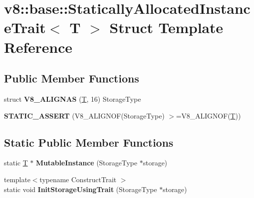 \hypertarget{structv8_1_1base_1_1StaticallyAllocatedInstanceTrait}{}\section{v8\+:\+:base\+:\+:Statically\+Allocated\+Instance\+Trait$<$ T $>$ Struct Template Reference}
\label{structv8_1_1base_1_1StaticallyAllocatedInstanceTrait}
\subsection*{Public Member Functions}
\begin{DoxyCompactItemize}
\item 
\mbox{\label{structv8_1_1base_1_1StaticallyAllocatedInstanceTrait_ae4f9b79f40375ee33813be5d10f3ad33}} 
struct {\bfseries V8\+\_\+\+A\+L\+I\+G\+N\+AS} (\mbox{\hyperlink{classv8_1_1internal_1_1torque_1_1T}{T}}, 16) Storage\+Type
\item 
\mbox{\label{structv8_1_1base_1_1StaticallyAllocatedInstanceTrait_ad25dddd250e48cf9f14f47214253c2de}} 
{\bfseries S\+T\+A\+T\+I\+C\+\_\+\+A\+S\+S\+E\+RT} (V8\+\_\+\+A\+L\+I\+G\+N\+OF(Storage\+Type) $>$=V8\+\_\+\+A\+L\+I\+G\+N\+OF(\mbox{\hyperlink{classv8_1_1internal_1_1torque_1_1T}{T}}))
\end{DoxyCompactItemize}
\subsection*{Static Public Member Functions}
\begin{DoxyCompactItemize}
\item 
\mbox{\label{structv8_1_1base_1_1StaticallyAllocatedInstanceTrait_a58f8bb54d3597d36e7063ead117276c9}} 
static \mbox{\hyperlink{classv8_1_1internal_1_1torque_1_1T}{T}} $\ast$ {\bfseries Mutable\+Instance} (Storage\+Type $\ast$storage)
\item 
\mbox{\label{structv8_1_1base_1_1StaticallyAllocatedInstanceTrait_a7490a549f3c89af617bd5aee7f8b70c6}} 
{\footnotesize template$<$typename Construct\+Trait $>$ }\\static void {\bfseries Init\+Storage\+Using\+Trait} (Storage\+Type $\ast$storage)
\end{DoxyCompactItemize}



